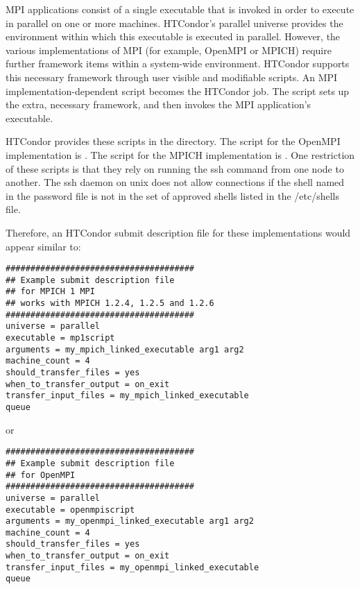 
MPI applications consist of a single executable that is invoked in order to
execute in parallel on one or more machines. 
HTCondor's parallel universe provides the environment within
which this executable is executed in parallel.
However, the various implementations of MPI
(for example, OpenMPI or MPICH) require further framework items within
a system-wide environment.
HTCondor supports this necessary framework through 
user visible and modifiable scripts.
An MPI implementation-dependent script becomes the HTCondor job.
The script sets up the extra, necessary framework,
and then invokes the MPI application's executable.

HTCondor provides these scripts in the
directory.
The script for the OpenMPI implementation is .
The script for the MPICH implementation is .
One restriction of these scripts is that they rely on running
the ssh command from one node to another.  The ssh daemon 
on unix does not allow connections if the shell named in
the password file is not in the set of approved shells
listed in the /etc/shells file.

Therefore, an HTCondor submit description file for these
implementations would appear similar to:

\begin{verbatim}
######################################
## Example submit description file
## for MPICH 1 MPI
## works with MPICH 1.2.4, 1.2.5 and 1.2.6
######################################
universe = parallel
executable = mp1script
arguments = my_mpich_linked_executable arg1 arg2
machine_count = 4
should_transfer_files = yes
when_to_transfer_output = on_exit
transfer_input_files = my_mpich_linked_executable
queue
\end{verbatim}

or

\begin{verbatim}
######################################
## Example submit description file
## for OpenMPI
######################################
universe = parallel
executable = openmpiscript
arguments = my_openmpi_linked_executable arg1 arg2
machine_count = 4
should_transfer_files = yes
when_to_transfer_output = on_exit
transfer_input_files = my_openmpi_linked_executable
queue
\end{verbatim}

